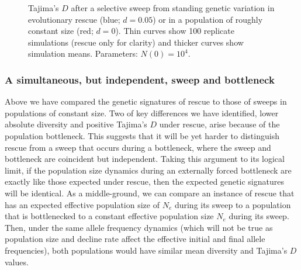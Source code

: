 \documentclass[]{article}
\begin{document}
\begin{figure}[htb]
\caption{
Tajima's $D$ after a selective sweep from standing genetic variation in evolutionary rescue (blue; $d=0.05$) or in a population of roughly constant size (red; $d=0$).
Thin curves show 100 replicate simulations (rescue only for clarity) and thicker curves show simulation means.
Parameters: $N(0)=10^4$.
}%
\label{fig:rescueSGV_tajimasD}
\end{figure}

\subsubsection*{A simultaneous, but independent, sweep and bottleneck}

Above we have compared the genetic signatures of rescue to those of sweeps in populations of constant size. 
Two of key differences we have identified, lower absolute diversity and positive Tajima's $D$ under rescue, arise because of the population bottleneck.
This suggests that it will be yet harder to distinguish rescue from a sweep that occurs during a bottleneck, where the sweep and bottleneck are coincident but independent.
Taking this argument to its logical limit, if the population size dynamics during an externally forced bottleneck are exactly like those expected under rescue, then the expected genetic signatures will be identical.
As a middle-ground, we can compare an instance of rescue that has an expected effective population size of $N_e$ during its sweep to a population that is bottlenecked to a constant effective population size $N_e$ during its sweep.
Then, under the same allele frequency dynamics (which will not be true as population size and decline rate affect the effective initial and final allele frequencies), both populations would have similar mean diversity and Tajima's $D$ values.
\end{document}
